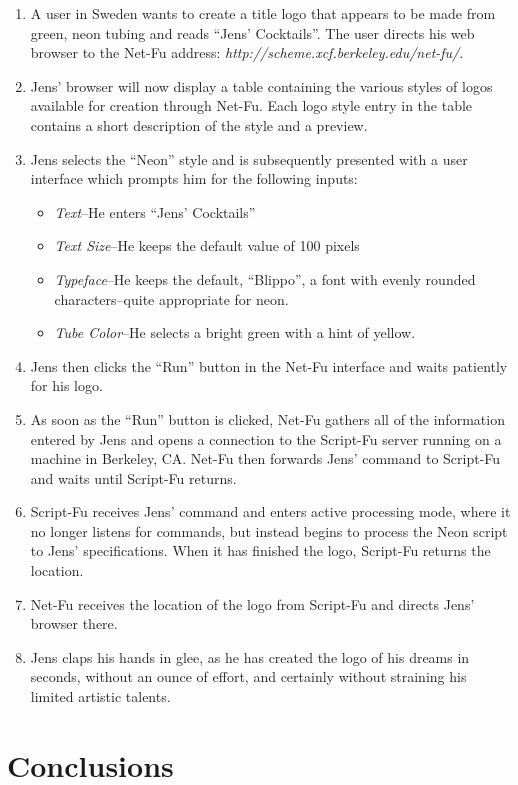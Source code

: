 \documentclass{article}
\begin{document}
\begin{enumerate}
\item A user in Sweden wants to create a title logo that appears to be
made from green, neon tubing and reads ``Jens' Cocktails''.  The user
directs his web browser to the Net-Fu address: {\it
http://scheme.xcf.berkeley.edu/net-fu/}.
\item Jens' browser will now display a table containing the various
styles of logos available for creation through Net-Fu.  Each logo style
entry in the table contains a short description of the style and a
preview.
\item Jens selects the ``Neon'' style and is subsequently presented
with a user interface which prompts him for the following inputs:
\begin{itemize}
\item {\it Text}--He enters ``Jens' Cocktails''
\item {\it Text Size}--He keeps the default value of 100 pixels
\item {\it Typeface}--He keeps the default, ``Blippo'', a font with
evenly rounded characters--quite appropriate for neon.
\item {\it Tube Color}--He selects a bright green with a hint of yellow.
\end{itemize}
\item Jens then clicks the ``Run'' button in the Net-Fu interface and
waits patiently for his logo.
\item As soon as the ``Run'' button is clicked, Net-Fu gathers all of
the information entered by Jens and opens a connection to the
Script-Fu server running on a machine in Berkeley, CA.  Net-Fu then
forwards Jens' command to Script-Fu and waits until Script-Fu returns.
\item Script-Fu receives Jens' command and enters active
processing mode, where it no longer listens for commands, but instead
begins to process the Neon script to Jens' specifications.  When it has
finished the logo, Script-Fu returns the location.
\item Net-Fu receives the location of the logo from Script-Fu
and directs Jens' browser there.
\item Jens claps his hands in glee, as he has created the logo of his
dreams in seconds, without an ounce of effort, and certainly without
straining his limited artistic talents.
\end{enumerate}

\section{Conclusions}
\end{document}
